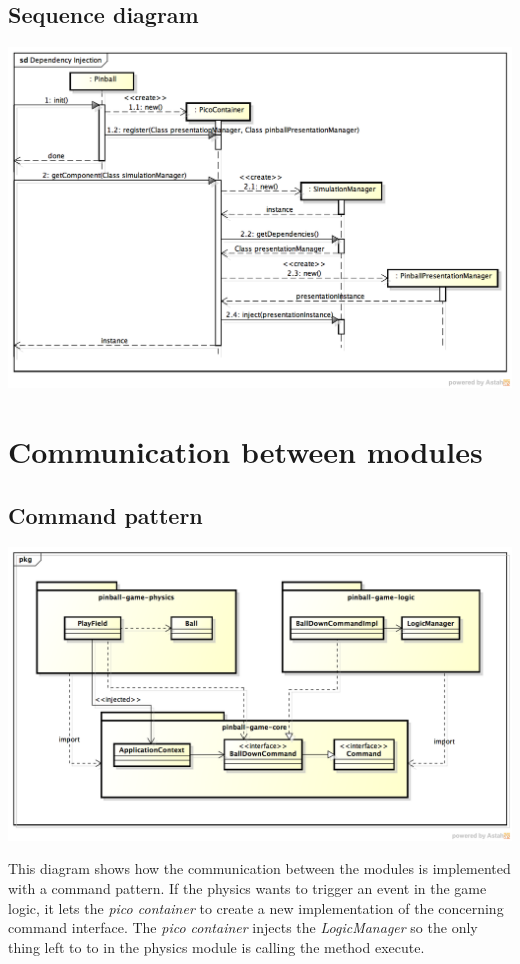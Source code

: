 \documentclass[fontsize=12pt,
               paper=a4,
               twoside=false,
               parskip=half,
               ]{scrartcl}
\begin{document}
\subsection{Sequence diagram}
\includegraphics[width=15.5cm]{./img/dependency-injection-sd.png}

\section{Communication between modules}
\subsection{Command pattern}
\includegraphics[width=15.5cm]{./img/command-pattern1.png}

This diagram shows how the communication between the modules is implemented with a command pattern. If the physics wants to trigger an event in the game logic, it lets the \emph{pico container} to create a new implementation of the concerning command interface. The \emph{pico container} injects the \emph{LogicManager} so the only thing left to to in the physics module is calling the method execute.
\end{document}
